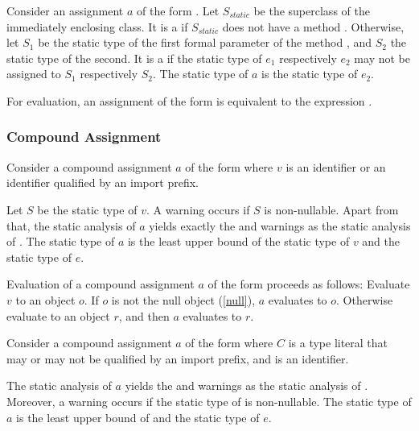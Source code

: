 \documentclass[makeidx]{article}
\begin{document}
{\LMHash{}%
Consider an assignment $a$ of the form .
Let $S_{static}$ be the superclass of the immediately enclosing class.
It is a
 if $S_{static}$ does not have a method \code{[]=}.
Otherwise, let $S_1$ be the static type of the
first formal parameter of the method \code{[]=},
and $S_2$ the static type of the second.
It is a
 if the static type of $e_1$ respectively $e_2$
may not be assigned to $S_1$ respectively $S_2$.
The static type of $a$ is the static type of $e_2$.

\LMHash{}%
For evaluation, an assignment of the form 
is equivalent to the expression .
\EndCase


\subsubsection{Compound Assignment}

\LMHash{}%
Consider a compound assignment $a$ of the form 
where $v$ is an identifier or an identifier qualified by an import prefix.

\LMHash{}%
Let $S$ be the static type of $v$.
A warning occurs if $S$ is non-nullable.
Apart from that,
the static analysis of $a$ yields
exactly the  and warnings as
the static analysis of .
The static type of $a$ is
the least upper bound of the static type of $v$ and the static type of $e$.

\LMHash{}%
Evaluation of a compound assignment $a$ of the form 
proceeds as follows:
Evaluate $v$ to an object $o$.
If $o$ is not the null object (\ref{null}), $a$ evaluates to $o$.
Otherwise evaluate  to an object $r$,
and then $a$ evaluates to $r$.
\EndCase

\LMHash{}%
Consider a compound assignment $a$ of the form 
where $C$ is a type literal
that may or may not be qualified by an import prefix,
and \id{} is an identifier.

\LMHash{}%
The static analysis of $a$ yields
the  and warnings as
the static analysis of .
Moreover, a warning occurs if
the static type of  is non-nullable.
The static type of $a$ is the least upper bound of
 and the static type of $e$.

}
\end{document}
